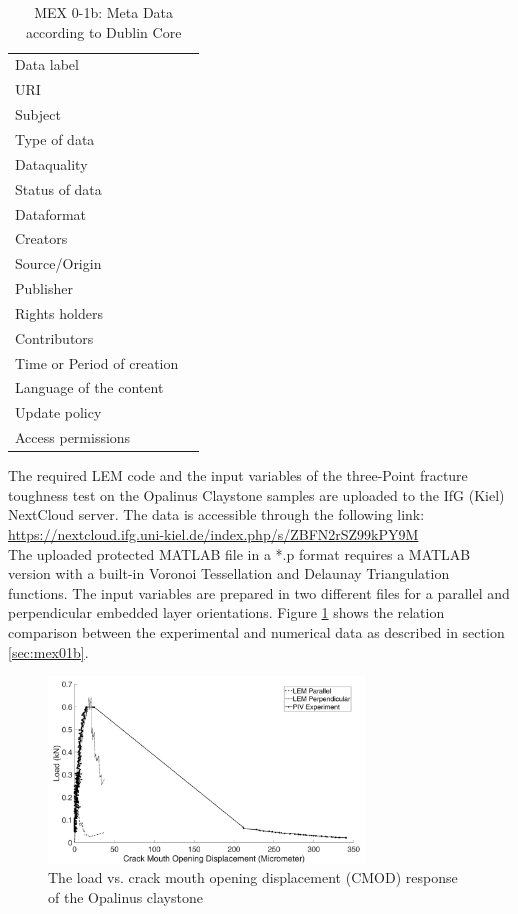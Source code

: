 \begin{table}[!ht]
\caption{MEX 0-1b: Meta Data according to Dublin Core}
\label{tab:dms-mex0-1b}
\small
\begin{tabular}{R{3cm}|L{7cm}}
\hline
%
Data label &  \\
URI &  \\
Subject  &  \\
Type of data  &  \\
Dataquality  &  \\
Status of data  &  \\
Dataformat  & \\
Creators  &  \\
Source/Origin &  \\
Publisher  &  \\
Rights holders &  \\
Contributors &  \\
Time or Period of creation &  \\
Language of the content &  \\
Update policy &  \\
Access permissions &  \\
%
\hline
\end{tabular}
\end{table}

The required LEM code and the input variables of the three-Point fracture toughness test on the Opalinus Claystone samples are uploaded to the IfG (Kiel) NextCloud server. The data is accessible through the following link:\\
\hyperlink{https://nextcloud.ifg.uni-kiel.de/index.php/s/ZBFN2rSZ99kPY9M}{https://nextcloud.ifg.uni-kiel.de/index.php/s/ZBFN2rSZ99kPY9M}\\

The uploaded protected MATLAB file in a *.p format requires a MATLAB version with a built-in Voronoi Tessellation and Delaunay Triangulation functions. The input variables are prepared in two different files for a parallel and perpendicular embedded layer orientations. Figure \ref{fig:Amir_ME1_LEM_Claystone_Data} shows the relation comparison between the experimental and numerical data as described in section \ref {sec:mex01b}.

\begin{figure}[!ht]
\centering
\includegraphics[width=0.75\textwidth]{figures/Amir_ME1_LEM_Claystone_Data.png}
\caption{The load vs. crack mouth opening displacement (CMOD) response of the Opalinus claystone}
\label{fig:Amir_ME1_LEM_Claystone_Data}
\end{figure}

